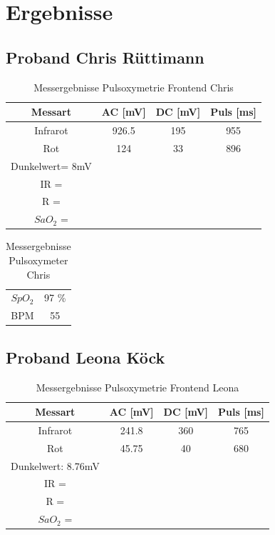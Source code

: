 \documentclass[11pt]{scrartcl}
\begin{document}
    \section{Ergebnisse}


    \subsection{Proband Chris Rüttimann}
    \begin {table} [h]
    \centering
    \caption{Messergebnisse Pulsoxymetrie Frontend Chris}
    \label{tab:chris_frontend}
    \begin{tabular}{c|c c c}
        Messart & AC [mV] & DC [mV] & Puls [ms] \\
        \hline
        Infrarot & 926.5 & 195 & 955 \\
        Rot & 124 & 33 & 896 \\
        \hline
        Dunkelwert= 8mV \\
        IR = \\
        R = \\
        $SaO_{2}$ =
    \end{tabular}  
    \end{table}

    \begin {table} [h]
    \centering
    \caption{Messergebnisse Pulsoxymeter Chris}
    \label{tab:chris_frontend}
    \begin{tabular}{c|c}
        $SpO_{2}$ & 97 \%  \\
        BPM & 55 
    \end{tabular}  
    \end{table}


    \pagebreak

    \subsection{Proband Leona Köck}
    \begin {table} [h]
    \centering
    \caption{Messergebnisse Pulsoxymetrie Frontend Leona}
    \label{tab:leona_frontend}
    \begin{tabular}{c|c c c}
        Messart & AC [mV] & DC [mV] & Puls [ms] \\
        \hline
        Infrarot & 241.8 & 360 & 765 \\
        Rot & 45.75 & 40 & 680 \\
        \hline
        Dunkelwert: 8.76mV \\
        IR = \\
        R = \\
        $SaO_{2}$ =
    \end{tabular}  
    \end{table}
\end{document}
